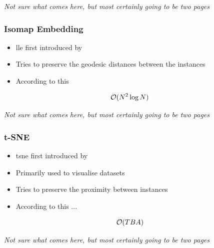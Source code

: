 \clearpage

\begin{center}
	\textit{Not sure what comes here, but most certainly going to be two pages}
\end{center}

\clearpage




\subsubsection{Isomap Embedding}

\begin{itemize}
	\item \Gls{lle} first introduced by \cite{tenenbaum2000global}
	\item Tries to preserve the geodesic distances between the instances \cite{HandsOnMLCh8}
	\item According to this \cite{DRUnsupervisedNearestNeighbors}
\end{itemize}

$$\mathcal{O}(N^2 \log N)$$

\clearpage

\begin{center}
	\textit{Not sure what comes here, but most certainly going to be two pages}
\end{center}

\clearpage



\subsubsection{t-SNE}

\begin{itemize}
	\item \gls{tsne} first introduced by \cite{van2008visualizing}
	\item Primarily used to visualise datasets
	\item Tries to preserve the proximity between instances \cite{HandsOnMLCh8}
	\item According to this ...
\end{itemize}

$$\mathcal{O}(TBA)$$

\clearpage

\begin{center}
	\textit{Not sure what comes here, but most certainly going to be two pages}
\end{center}

\clearpage
